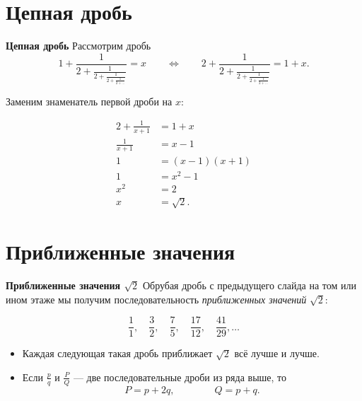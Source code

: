 \documentclass[11pt]{beamer}
\newcommand\fram[2]{\begin{frame}{\bf #1} #2 \end{frame}}
\begin{document}
\section{Цепная дробь}
\fram{Цепная дробь}{
Рассмотрим дробь
$$1+\frac{1}{2+\frac{1}{2+\frac{1}{2+\frac{1}{2+\ldots}}}} = x \qquad \Longleftrightarrow \qquad 2+\frac{1}{2+\frac{1}{2+\frac{1}{2+\frac{1}{2+\ldots}}}} = 1+x.$$

Заменим знаменатель первой дроби на $x$:\vspace{-5mm}

\begin{align*}
    2 + \frac{1}{x+1} &= 1+x\\
    \frac{1}{x+1} &= x-1\\
    1 &= (x-1)(x+1)\\
    1 &= x^2 - 1\\
    x^2 &= 2\\
    x &= \sqrt{2}.
\end{align*}
}

\section{Приближенные значения}
\fram{Приближенные значения $\sqrt{2}$}{
Обрубая дробь с предыдущего слайда на том или ином этаже мы получим последовательность \textit{приближенных значений} $\sqrt{2}$:

$$\frac{1}{1}, \quad \frac{3}{2}, \quad \frac{7}{5}, \quad \frac{17}{12}, \quad \frac{41}{29}, \ldots$$

\begin{itemize}
    \item Каждая следующая такая дробь приближает $\sqrt{2}$ всё лучше и лучше.
    \item Если $\frac{p}{q}$ и $\frac{P}{Q}$ --- две последовательные дроби из ряда выше, то
    $$P = p+2q, \qquad\qquad Q = p+q.$$
\end{itemize}
}
\end{document}
